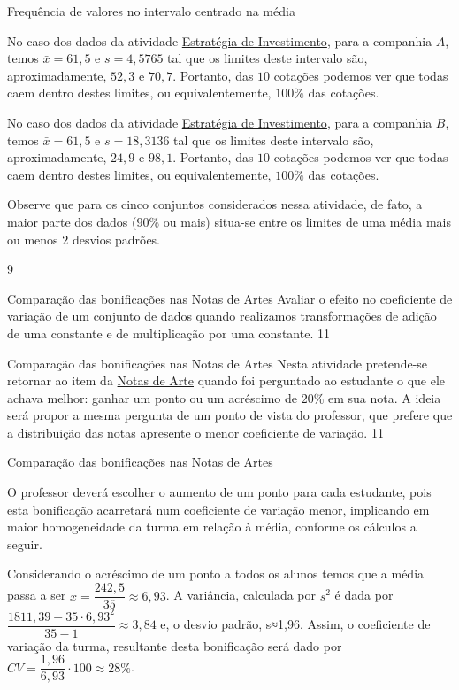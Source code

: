 {\begin{answer}{Frequência de valores no intervalo centrado na média}
{No caso dos dados da atividade \hyperref[\detokenize{PE104-3:ativ-estrategia-de-investimento}]{Estratégia de Investimento}, para a companhia $A$, temos $\bar{x}=61{,}5$ e $s=4{,}5765$ tal que os limites deste intervalo são, aproximadamente, $52{,}3$ e $70{,}7$. Portanto, das $10$ cotações podemos ver que todas caem dentro destes limites, ou equivalentemente, $100\%$ das cotações.

No caso dos dados da atividade \hyperref[\detokenize{PE104-3:ativ-estrategia-de-investimento}]{Estratégia de Investimento}, para a companhia $B$, temos $\bar{x}=61{,}5$ e $s=18{,}3136$ tal que os limites deste intervalo são, aproximadamente, $24{,}9$ e $98{,}1$. Portanto, das $10$ cotações podemos ver que todas caem dentro destes limites, ou equivalentemente, $100\%$ das cotações.

Observe que para os cinco conjuntos considerados nessa atividade, de fato, a maior parte dos dados ($90\%$ ou mais) situa-se entre os limites de uma média mais ou menos $2$ desvios padrões.
\columnbreak

\phantom{a}
}{9}
\end{answer}

\begin{objectives}{Comparação das bonificações nas Notas de Artes}
{
Avaliar o efeito no coeficiente de variação de um conjunto de dados quando realizamos transformações de adição de uma constante e de multiplicação por uma constante.
}{1}{1}
\end{objectives}
\marginpar{\vspace{-2em}}
\begin{sugestions}{Comparação das bonificações nas Notas de Artes}
{
Nesta atividade pretende-se retornar ao item  da \hyperref[\detokenize{PE104-0:ativ-notas-de-artes}]{Notas de Arte} quando foi perguntado ao estudante o que ele achava melhor: ganhar um ponto ou um acréscimo de $20\%$ em sua nota. A ideia será propor a mesma pergunta de um ponto de vista do professor, que prefere que a distribuição das notas apresente o menor coeficiente de variação.
}{1}{1}
\end{sugestions}
\begin{answer}{Comparação das bonificações nas Notas de Artes}
{
O professor deverá escolher o aumento de um ponto para cada estudante, pois esta bonificação acarretará num coeficiente de variação menor, implicando em maior homogeneidade da turma em relação à média, conforme os cálculos a seguir.

Considerando o acréscimo de um ponto a todos os alunos temos que a média passa a ser $\bar{x}=\dfrac{242{,}5}{35}\approx6{,}93$. A variância, calculada por $s^2$ é dada por $\dfrac{1811{,}39-35\cdot6{,}93^2}{35-1}\approx3{,}84$ e, o desvio padrão, s≈1,96. Assim, o coeficiente de variação da turma, resultante desta bonificação será dado por $CV=\dfrac{1{,}96}{6{,}93}\cdot100\approx28\%$.

}
\end{answer}}
